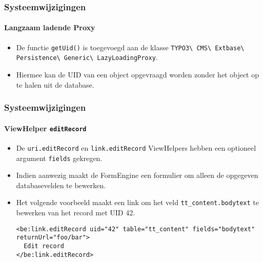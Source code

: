 
\begin{frame}[fragile]
	\frametitle{Systeemwijzigingen}
	\framesubtitle{Langzaam ladende Proxy}

	\lstset{basicstyle=\tiny\ttfamily}

	\begin{itemize}
		\item De functie \texttt{getUid()} is toegevoegd aan de klasse\newline
			\texttt{TYPO3\textbackslash
				CMS\textbackslash
				Extbase\textbackslash
				Persistence\textbackslash
				Generic\textbackslash
				LazyLoadingProxy}.
		\item Hiermee kan de UID van een object opgevraagd worden zonder het object op te halen uit de database.

	\end{itemize}

\end{frame}


\begin{frame}[fragile]
	\frametitle{Systeemwijzigingen}
	\framesubtitle{ViewHelper \texttt{editRecord}}

	\lstset{basicstyle=\tiny\ttfamily}

	\begin{itemize}
		\item De \texttt{uri.editRecord} en \texttt{link.editRecord} ViewHelpers hebben een
			optioneel argument \texttt{fields} gekregen.
		\item Indien aanwezig maakt de FormEngine een formulier om alleen de opgegeven databasevelden te bewerken.
		\item Het volgende voorbeeld maakt een link om het veld \texttt{tt\_content.bodytext}
			te bewerken van het record met UID 42.
\begin{lstlisting}
<be:link.editRecord uid="42" table="tt_content" fields="bodytext" returnUrl="foo/bar">
  Edit record
</be:link.editRecord>
\end{lstlisting}

	\end{itemize}

\end{frame}


